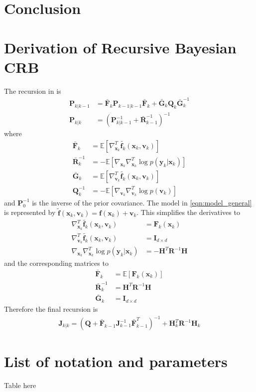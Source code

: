 \documentclass{article}
\renewcommand{\vec}[1]{\ensuremath{{\boldsymbol #1}}}
\newcommand{\mat}[1]{\ensuremath{\boldsymbol{#1}}}
\begin{document}
\section{Conclusion}

\appendix
\section{Derivation of Recursive Bayesian CRB}\label{sec:derivation_recursion}

The recursion in \cite{Bergman2001} is
\begin{subequations}
\begin{align}
	\mat P_{k|k-1} &= \bar{\mat F}_k\mat P_{k-1|k-1}\bar{\mat F}_k + \bar{\mat G}_k\mat Q_k \bar{\mat G}_k^{-1} \\
		\mat P_{k|k} &= \left(\mat P_{k|k-1}^{-1} + \bar{\mat R}_{k-1}^{-1}\right)^{-1}
\end{align}
\end{subequations}
where
\begin{align}
	\bar{\mat F}_k &= \mathbb E \left[ \nabla_{\vec x_k}^T \tilde{\vec f_k}(\vec x_k,\vec v_k)\right] \\
	\bar{\mat R}_k^{-1} &= -\mathbb E\left[ \nabla_{\vec x_k}\nabla_{\vec x_k}^T \log p(\vec y_k|\vec x_k) \right] \\
	\bar{\mat G}_k &= \mathbb E \left[ \nabla_{\vec v_k}^T \tilde{\vec f_k}(\vec x_k,\vec v_k)\right] \\
	\mat Q_k^{-1} &= -\mathbb E \left[ \nabla_{\vec v_k}\nabla_{\vec v_k}^T \log p(\vec v_k) \right]
\end{align}
and $\mat P_0^{-1}$ is the inverse of the prior covariance. The model in \eqref{eqn:model_general} is represented by $\tilde{\vec f}(\vec x_k,\vec v_k) = \vec f(\vec x_k) + \vec v_k$. This simplifies the derivatives to
\begin{align}
	\nabla_{\vec x_k}^T \tilde{\vec f_k}(\vec x_k,\vec v_k) &= \mat F_k(\vec x_k) \\
	\nabla_{\vec v_k}^T \tilde{\vec f_k}(\vec x_k,\vec v_k) &= \mat I_{d\times d} \\
	\nabla_{\vec x_k}\nabla_{\vec x_k}^T \log p(\vec y_k|\vec x_k) &= -\mat H^T\mat R^{-1} \mat H 
\end{align}
and the corresponding matrices to	
\begin{align}
	\bar{\mat F}_k &= \mathbb E\left[ \mat F_k(\vec x_k)\right] \label{eqn:pcrb_term_F}\\
	\bar{\mat R}_k^{-1} &= \mat H^T\mat R^{-1} \mat H \\
	\bar{\mat G}_k &= \mat I_{d\times d} 
\end{align}
Therefore the final recursion is
\begin{align}
	\mat J_{k|k} = \left( \mat Q + \bar{\mat F}_{k-1} \mat J_{k-1}^{-1} \bar{\mat F}_{k-1}^T\right)^{-1} + \mat H_k^T \mat R^{-1} \mat H_k
\end{align}

\section{List of notation and parameters}
\label{sec:parameter_table}

Table here


\small


\end{document}
